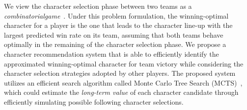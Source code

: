 
We view the character selection phase between two teams as a \textit{combinatorial\linebreak game}~\cite{browne2012survey}. Under this problem formulation, the winning-optimal character for a player is the one that leads to the character line-up with the largest predicted win rate on its team, assuming that both teams behave optimally in the remaining of the character selection phase.  We propose a character recommendation system that is able to efficiently identify the approximated winning-optimal character for team victory while considering the character selection strategies adopted by other players. The proposed system utilizes an efficient search algorithm called Monte Carlo Tree Search (MCTS)~\cite{kocsis2006bandit}, which could estimate the \textit{long-term value} of each character candidate through efficiently simulating possible following character selections. 





